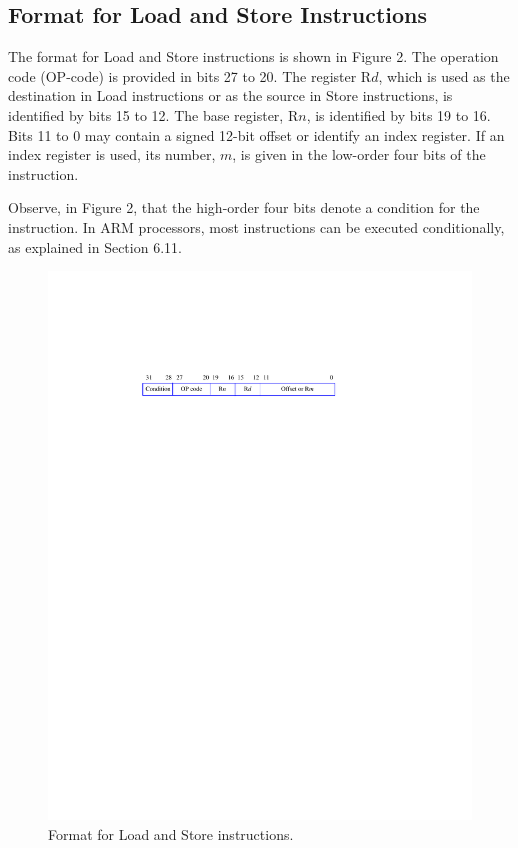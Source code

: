 \documentclass[11pt, twoside, pdftex]{article}
\begin{document}
\subsection{Format for Load and Store Instructions}

The format for Load and Store instructions is shown in Figure 2.
The operation code (OP-code) is provided in bits 27 to 20.
The register R$d$, which is used as the destination in Load instructions or as the source in Store instructions, is
identified by bits 15 to 12.
The base register, R$n$, is identified by bits 19 to 16.
Bits 11 to 0 may contain a signed 12-bit offset or identify
an index register.
If an index register is used, its number, $m$, is given in 
the low-order four bits of the instruction.

Observe, in Figure 2, that the high-order four bits denote a
condition for the instruction. In ARM processors, most
instructions can be executed conditionally, as explained in
Section 6.11.

\begin{figure}[H]
   \begin{center}
      \includegraphics[scale=1]{figures/figure2.pdf}
   \caption{Format for Load and Store instructions.} 
	 \label{fig:2}
	 \end{center}
\end{figure} 
\end{document}
